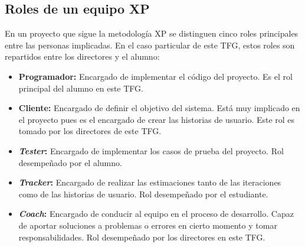 \subsection{Roles de un equipo XP}
En un proyecto que sigue la metodología \gls{XP} se distinguen cinco roles principales entre las personas implicadas. En el caso particular de este \gls{TFG}, estos roles son repartidos entre los directores y el alumno:
\begin{itemize}
\item \textbf{Programador:} Encargado de implementar el código del proyecto. Es el rol principal del alumno en este \gls{TFG}.
\item \textbf{Cliente:} Encargado de definir el objetivo del sistema. Está muy implicado en el proyecto pues es el encargado de crear las historias de usuario. Este rol es tomado por los directores de este \gls{TFG}.
\item \textbf{\textit{Tester}:} Encargado de implementar los casos de prueba del proyecto. Rol desempeñado por el alumno.
\item \textbf{\textit{Tracker}:} Encargado de realizar las estimaciones tanto de las iteraciones como de las historias de usuario. Rol desempeñado por el estudiante.
  \item \textbf{\textit{Coach}:} Encargado de conducir al equipo en el proceso de desarrollo. Capaz de aportar soluciones a problemas o errores en cierto momento y tomar responsabilidades. Rol desempeñado por los directores en este \gls{TFG}.

\end{itemize}
